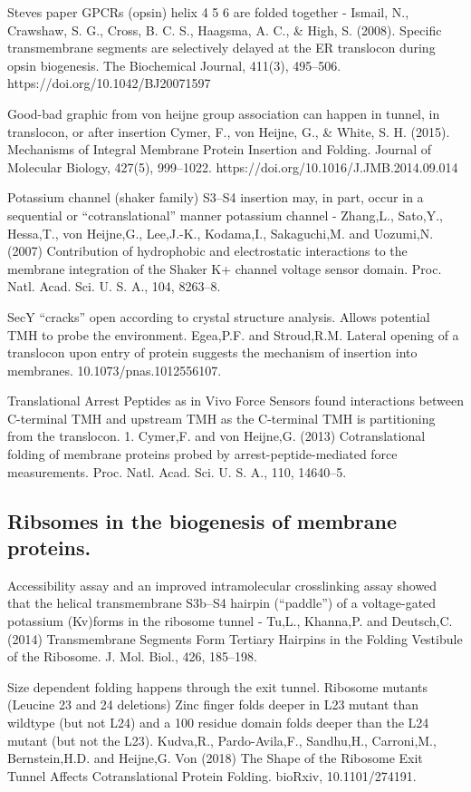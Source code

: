 Steves paper GPCRs (opsin) helix 4 5 6 are folded together - Ismail, N., Crawshaw, S. G., Cross, B. C. S., Haagsma, A. C., \& High, S. (2008). Specific transmembrane segments are selectively delayed at the ER translocon during opsin biogenesis. The Biochemical Journal, 411(3), 495–506. https://doi.org/10.1042/BJ20071597

Good\--bad graphic from von heijne group association can happen in tunnel, in translocon, or after insertion Cymer, F., von  Heijne, G., \& White, S. H. (2015). Mechanisms of Integral Membrane Protein Insertion and Folding. Journal of Molecular Biology, 427(5), 999–1022. https://doi.org/10.1016/J.JMB.2014.09.014

Potassium channel (shaker family) S3–S4 insertion may, in part, occur in a sequential or “cotranslational” manner potassium channel - Zhang,L., Sato,Y., Hessa,T., von Heijne,G., Lee,J.-K., Kodama,I., Sakaguchi,M. and Uozumi,N. (2007) Contribution of hydrophobic and electrostatic interactions to the membrane integration of the Shaker K+ channel voltage sensor domain. Proc. Natl. Acad. Sci. U. S. A., 104, 8263–8.

SecY “cracks” open according to crystal structure analysis. Allows potential TMH to probe the environment. Egea,P.F. and Stroud,R.M. Lateral opening of a translocon upon entry of protein suggests the mechanism of insertion into membranes. 10.1073/pnas.1012556107.

Translational Arrest Peptides as in Vivo Force Sensors found interactions between C-terminal TMH and upstream TMH as the C-terminal TMH is partitioning from the translocon. 1. Cymer,F. and von Heijne,G. (2013) Cotranslational folding of membrane proteins probed by arrest-peptide-mediated force measurements. Proc. Natl. Acad. Sci. U. S. A., 110, 14640–5.

\subsection{Ribsomes in the biogenesis of membrane proteins.}
Accessibility assay and an improved intramolecular crosslinking assay showed that the helical transmembrane S3b–S4 hairpin (“paddle”) of a voltage-gated potassium (Kv)forms in the ribosome tunnel - Tu,L., Khanna,P. and Deutsch,C. (2014) Transmembrane Segments Form Tertiary Hairpins in the Folding Vestibule of the Ribosome. J. Mol. Biol., 426, 185–198.

 Size dependent folding happens through the exit tunnel. Ribosome mutants (Leucine 23 and 24 deletions) Zinc finger folds deeper in L23 mutant than wildtype (but not L24) and a 100 residue domain folds deeper than the L24 mutant (but not the L23). Kudva,R., Pardo-Avila,F., Sandhu,H., Carroni,M., Bernstein,H.D. and Heijne,G. Von (2018) The Shape of the Ribosome Exit Tunnel Affects Cotranslational Protein Folding. bioRxiv, 10.1101/274191.

